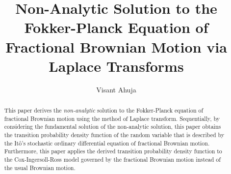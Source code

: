 \documentclass[preprint, 12pt]{elsarticle}
\numberwithin{equation}{section}
\theoremstyle{plain}
\theoremstyle{remark}
\begin{document}

\begin{frontmatter}



\title{Non-Analytic Solution to the Fokker-Planck Equation of Fractional Brownian Motion via Laplace Transforms}



\author{Visant Ahuja}

\address{Mahidol University International College, Mahidol University\\ Present address: D.S. Tower 1 Room 18A2, 98 Dangudom Soi, Sukhumvit 33 Road\\ Klongton, Wattana\\ Bangkok 10110, Thailand}%

\begin{abstract}
This paper derives the \emph{non-analytic} solution to the Fokker-Planck equation of fractional Brownian motion using the method of Laplace transform. Sequentially, by considering the fundamental solution of the non-analytic solution, this paper obtains the transition probability density function of the random variable that is described by the It{\^ o}'s stochastic ordinary differential equation of fractional Brownian motion. Furthermore, this paper applies the derived transition probability density function to the Cox-Ingersoll-Ross model governed by the fractional Brownian motion instead of the usual Brownian motion.


\end{abstract}
\end{frontmatter}
\end{document}
